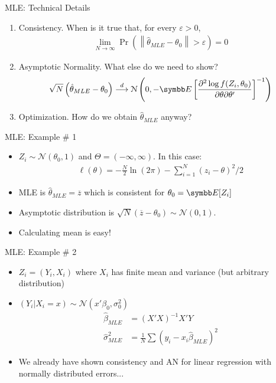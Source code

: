 \documentclass[aspectratio=169,11pt]{beamer}
\begin{document}
\begin{frame}{MLE: Technical Details}
\begin{enumerate}
\item Consistency. When is it true that, for every $\varepsilon>0$,
\begin{align*}
\lim _ { N \rightarrow \infty } \Pr \left( \left\| \hat { \theta } _ { MLE } - \theta _ { 0 } \right\| > \varepsilon \right) = 0
\end{align*}
\item Asymptotic Normality. What else do we need to show?
\begin{align*}
\sqrt { N } \left( \hat { \theta } _ { MLE } - \theta _ { 0 } \right) \stackrel { d } { \longrightarrow } \mathcal { N } \left( 0 , - \E \left[  \frac { \partial ^ { 2 }\log f(Z _ { i } , \theta _ { 0 } ) } { \partial \theta \partial \theta ^ { \prime } }   \right] ^ { - 1 } \right)
\end{align*}
\item Optimization. How do we obtain $\widehat{\theta}_{MLE}$ anyway?
\end{enumerate}
\end{frame}


\begin{frame}{MLE: Example \# 1}
\begin{itemize}
\item $Z_i \sim \mathcal{N}(\theta_0,1)$ and $\Theta = (-\infty,\infty)$. In this case:
\begin{align*}
\ell ( \theta ) = - \frac{N}{2} \ln ( 2 \pi ) - \sum _ { i = 1 } ^ { N } \left( z _ { i } - \theta \right) ^ { 2 } / 2
\end{align*}
\item MLE is $\widehat{\theta}_{MLE}=\overline{z}$ which is consistent for $\theta_0 = \E[Z_i]$
\item Asymptotic distribution is $\sqrt{N} ( \overline{z}-\theta_0) \sim \mathcal{N}(0,1)$.
\item Calculating mean is easy!
\end{itemize}
\end{frame}




\begin{frame}{MLE: Example \# 2}
\begin{itemize}
\item $Z_i = (Y_i, X_i)$ where  $X_i$ has finite mean and variance (but arbitrary distribution)
\item $(Y_i | X_i  =x) \sim  \mathcal{N}(x' \beta_0, \sigma_0^2)$
\begin{align*}
\widehat{\beta}_{MLE} &= (X'X)^{-1} X'Y\\
\widehat{\sigma}^2_{MLE} &= \frac{1}{N} \sum (y_i - x_i \widehat{\beta}_{MLE})^2
\end{align*}
\item We already have shown consistency and AN for linear regression with normally distributed errors...
\end{itemize}
\end{frame}
\end{document}
